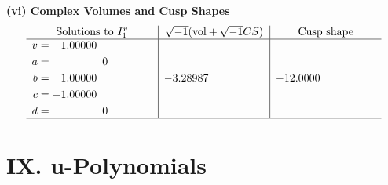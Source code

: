 \documentclass[1p]{elsarticle_modified}
\theoremstyle{definition}
\newcommand{\I}{\sqrt{-1}}
\begin{document}
\newpage\flushleft \textbf{(vi) Complex Volumes and Cusp Shapes}
$$\begin{array}{c|c|c}  
\text{Solutions to }I^v_{1}& \I (\text{vol} + \sqrt{-1}CS) & \text{Cusp shape}\\
 \hline 
\begin{aligned}
v &= \phantom{-}1.00000\phantom{ +0.000000I} \\
a &= \phantom{-0.000000 } 0 \\
b &= \phantom{-}1.00000\phantom{ +0.000000I} \\
c &= -1.00000\phantom{ +0.000000I} \\
d &= \phantom{-0.000000 } 0\end{aligned}
 & -3.28987\phantom{ +0.000000I} & -12.0000\phantom{ +0.000000I}\\
 \hline 
 \end{array}$$\newpage
\newpage\renewcommand{\arraystretch}{1}
\centering \section*{ IX. u-Polynomials}
\end{document}
